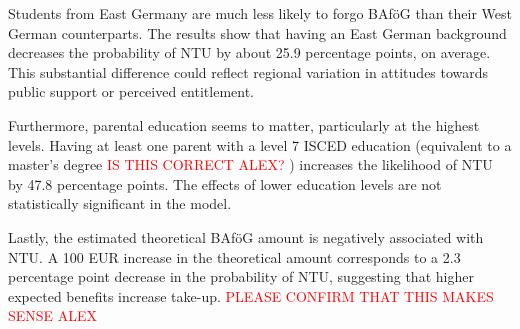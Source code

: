 Students from East Germany are much less likely to forgo BAföG than their West German counterparts. The results show that having an East German background decreases the probability of NTU by about 25.9 percentage points, on average. This substantial difference could reflect regional variation in attitudes towards public support or perceived entitlement.

Furthermore, parental education seems to matter, particularly at the highest levels. Having at least one parent with a level 7 ISCED education (equivalent to a master’s degree \textcolor{red}{IS THIS CORRECT ALEX?}
) increases the likelihood of NTU by 47.8 percentage points. The effects of lower education levels are not statistically significant in the model.

Lastly, the estimated theoretical BAföG amount is negatively associated with NTU. A 100 EUR increase in the theoretical amount corresponds to a 2.3 percentage point decrease in the probability of NTU, suggesting that higher expected benefits increase take-up. \textcolor{red}{PLEASE CONFIRM THAT THIS MAKES SENSE ALEX}


